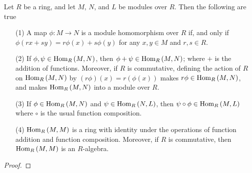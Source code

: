 \begin{lemma}\label{4.2.2}
    Let $R$ be a ring, and let $M$, $N$, and $L$ be modules over $R$. Then the
    following are true
    \begin{enumerate}
        \item[(1)] A map $\phi:M \xrightarrow{} N$ is a module homomorphism over
            $R$ if, and only if $\phi(rx+sy)=r\phi(x)+s\phi(y)$ for any $x,y
            \in M$ and  $r,s \in R$.

        \item[(2)] If $\phi, \psi \in \operatorname{Hom}_R{(M,N)}$, then $\phi+\psi \in
            \operatorname{Hom}_R{(M,N)}$; where $+$ is the addition of functions. Moreover, if
             $R$ is commutative, defining the action of  $R$ on  $\operatorname{Hom}_R{(M,N)}$
             by $(r\phi)(x)=r(\phi(x))$ makes $r\phi \in \operatorname{Hom}_R{(M,N)}$, and
             makes $\operatorname{Hom}_R{(M,N)}$ into a module over $R$.

         \item[(3)] If $\phi \in \operatorname{Hom}_R{(M,N)}$ and $\psi \in \operatorname{Hom}_R{(N,L)}$,
             then $\psi \circ \phi \in \operatorname{Hom}_R{(M,L)}$ where $\circ$ is the usual
             function composition.

         \item[(4)] $\operatorname{Hom}_R{(M,M)}$ is a ring with identity under the operations
             of function addition and function composition. Moreover, if $R$ is
             commutative, then  $\operatorname{Hom}_R{(M,M)}$ is an $R$-algebra.
    \end{enumerate}
\end{lemma}
\begin{proof}
\end{proof}
